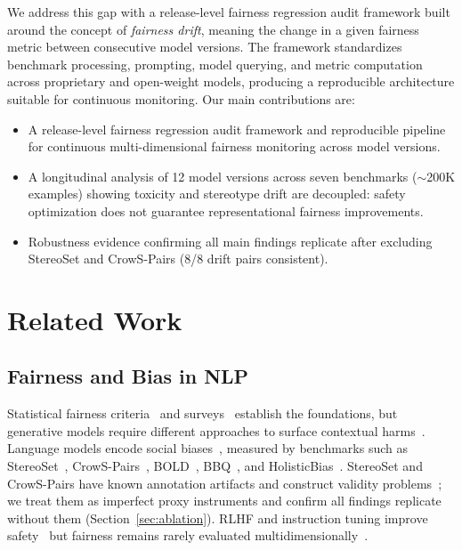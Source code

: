 \documentclass[11pt]{article}
\begin{document}
We address this gap with a release-level fairness regression audit framework built around the concept of \emph{fairness drift}, meaning the change in a given fairness metric between consecutive model versions. The framework standardizes benchmark processing, prompting, model querying, and metric computation across proprietary and open-weight models, producing a reproducible architecture suitable for continuous monitoring. Our main contributions are:
\begin{itemize}
\item A release-level fairness regression audit framework and reproducible pipeline for continuous multi-dimensional fairness monitoring across model versions.
\item A longitudinal analysis of 12 model versions across seven benchmarks ($\sim$200K examples) showing toxicity and stereotype drift are decoupled: safety optimization does not guarantee representational fairness improvements.
\item Robustness evidence confirming all main findings replicate after excluding StereoSet and CrowS-Pairs (8/8 drift pairs consistent).
\end{itemize}

\section{Related Work}

\subsection{Fairness and Bias in NLP}
Statistical fairness criteria~\citep{hardt2016equality,barocas2016bigdata} and surveys~\citep{mehrabi2021survey,ferrara2024fairness} establish the foundations, but generative models require different approaches to surface contextual harms~\citep{blodgett2020language,blodgett2021measuring}. Language models encode social biases~\citep{caliskan2017bias}, measured by benchmarks such as StereoSet~\citep{nadeem2021stereoset}, CrowS-Pairs~\citep{nangia2020crows}, BOLD~\citep{dhamala2021bold}, BBQ~\citep{parrish2022bbq}, and HolisticBias~\citep{smith2022holisticbias}. StereoSet and CrowS-Pairs have known annotation artifacts and construct validity problems~\citep{blodgett2021measuring}; we treat them as imperfect proxy instruments and confirm all findings replicate without them (Section~\ref{sec:ablation}). RLHF and instruction tuning improve safety~\citep{ouyang2022rlhf,bai2022constitutional} but fairness remains rarely evaluated multidimensionally~\citep{blodgett2021measuring,mitchell2019modelcards,raji2020accountability}.
\end{document}
